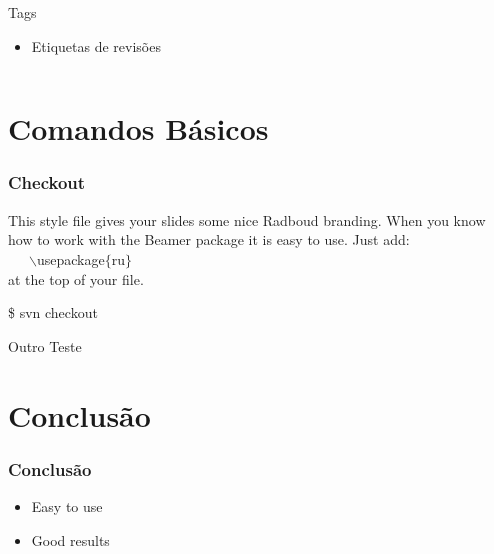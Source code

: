 \documentclass{beamer}
\begin{document}
\begin{frame}
\begin{columns}
\begin{column}{.5\textwidth}
\begin{figure}
            \end{figure}
            \begin{block}{Tags}
                \begin{itemize}
                    \item Etiquetas de revis\~oes
                \end{itemize}
            \end{block}
        \end{column}

    \end{columns}

\end{frame}


\section{Comandos B\'asicos}

\begin{frame}
    \frametitle{Checkout}

    This style file gives your slides some nice Radboud branding.
    When you know how to work with the Beamer package it is easy to use.
    Just add:\\ ~~~$\backslash$usepackage$\{$ru$\}$ \\ at the top of your file.


    \begin{bash}{}
        \$ svn checkout
    \end{bash}

    \begin{block}{Outro}
        Teste
    \end{block}
\end{frame}

\section{Conclus\~ao}

\begin{frame}
    \frametitle{Conclus\~ao}

    \begin{itemize}
        \item Easy to use
        \item Good results
    \end{itemize}
\end{frame}
\end{document}
